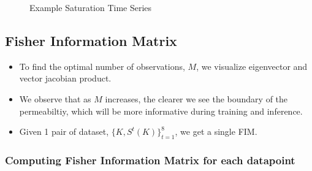 \documentclass[
]{article}
\providecommand{\tightlist}{%
  \setlength{\itemsep}{0pt}\setlength{\parskip}{0pt}}\usepackage{longtable,booktabs,array}
\begin{document}
\begin{figure}

\begin{minipage}{\linewidth}



\end{minipage}%
\newline
\begin{minipage}{\linewidth}



\end{minipage}%

\caption{\label{fig-S}Example Saturation Time Series}

\end{figure}%

\subsection{Fisher Information Matrix}\label{fisher-information-matrix}

\begin{itemize}
\tightlist
\item
  To find the optimal number of observations, \(M\), we visualize
  eigenvector and vector jacobian product.
\item
  We observe that as \(M\) increases, the clearer we see the boundary of
  the permeabiltiy, which will be more informative during training and
  inference. 
\item
  Given 1 pair of dataset, \(\{K, S^t(K)\}^8_{t=1}\), we get a single
  FIM.
\end{itemize}

\subsubsection{Computing Fisher Information Matrix for each
datapoint}\label{computing-fisher-information-matrix-for-each-datapoint}
\end{document}
